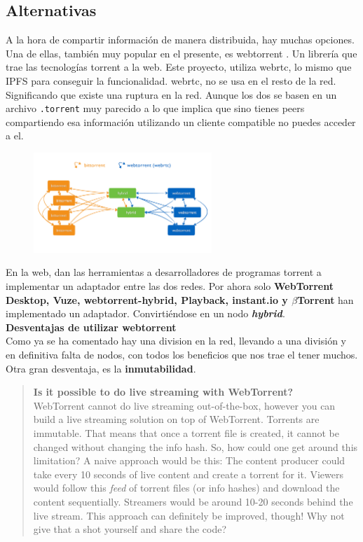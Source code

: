 \subsection{Alternativas}
A la hora de compartir información de manera distribuida, hay muchas opciones. Una de ellas, también muy popular en el presente, es webtorrent \cite{web:webtorrent}. Un librería que trae las tecnologías torrent a la web.
Este proyecto, utiliza webrtc, lo mismo que IPFS \cite{web:ipfs} para conseguir la funcionalidad. webrtc, no se usa en el resto de la red. Significando que existe una ruptura en la red. Aunque los dos se basen en un archivo \verb|.torrent| muy parecido a lo que implica que sino tienes peers compartiendo esa información utilizando un cliente compatible no puedes acceder a el.
\begin{figure}[h!]
    \centering
    \includegraphics[width=0.6\textwidth]{Figures/68747470733a2f2f776562746f7272656e742e696f2f696d672f6e6574776f726b2e706e67.png}
    \label{fg:webtorrent}
\end{figure}
En la web, dan las herramientas a desarrolladores de programas torrent a implementar un adaptador entre las dos redes. Por ahora solo \textbf{WebTorrent Desktop, Vuze, webtorrent-hybrid, Playback, instant.io y \(\beta\)Torrent} han implementado un adaptador. Convirtiéndose en un nodo \textbf{\textit{hybrid}}.\\
\textbf{Desventajas de utilizar webtorrent}\\
Como ya se ha comentado hay una division en la red, llevando a una división y en definitiva falta de nodos, con todos los beneficios que nos trae el tener muchos.
Otra gran desventaja, es la \textbf{inmutabilidad}.
\begin{quote}
    \textbf{Is it possible to do live streaming with WebTorrent?}\\
    WebTorrent cannot do live streaming out-of-the-box, however you can build a live streaming solution on top of WebTorrent.
    Torrents are immutable. That means that once a torrent file is created, it cannot be changed without changing the info hash. So, how could one get around this limitation?
    A naive approach would be this: The content producer could take every 10 seconds of live content and create a torrent for it. Viewers would follow this \textit{feed} of torrent files (or info hashes) and download the content sequentially. Streamers would be around 10-20 seconds behind the live stream.
    This approach can definitely be improved, though! Why not give that a shot yourself and share the code? \cite{web:webtorrent_faq}
\end{quote}
